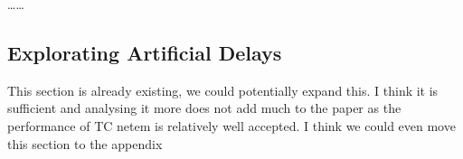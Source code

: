 \documentclass[sigconf]{acmart}
\begin{document}
\dots \dots

 



\subsection{Explorating Artificial Delays}

This section is already existing, we could potentially expand this. I think it is sufficient and analysing it more does not add much to the paper as the performance of TC netem is relatively well accepted. I think we could even move this section to the appendix

%
%
%
\end{document}
